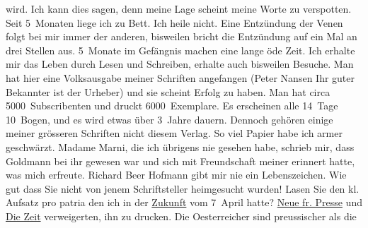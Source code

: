 \begin{ledgroupsized}[t]{13cm}
               wird.\pend
           \pstart
           Ich kann dies sagen, denn meine Lage scheint meine Worte zu verspotten. Seit
               5 Monaten liege ich zu Bett. Ich heile nicht. Eine Entzündung der Venen folgt bei mir
               immer der anderen, bisweilen bricht die Entzündung auf ein Mal an drei Stellen aus.
               5 Monate im Gefängnis machen eine lange öde Zeit. Ich erhalte mir das Leben {\pb}durch Lesen und Schreiben, erhalte
               auch bisweilen Besuche. Man hat hier eine Volksausgabe meiner Schriften angefangen (Peter Nansen Ihr guter Bekannter ist der
               Urheber) und sie scheint Erfolg zu haben. Man hat circa 5000 Subscribenten und druckt
               6000 Exemplare. Es erscheinen alle 14 Tage 10 Bogen, und es wird etwas über 3 Jahre
               dauern. Dennoch gehören einige meiner grösseren Schriften nicht diesem Verlag. So
               viel Papier habe ich armer geschwärzt.\pend
           \pstart
           Madame Marni, die ich übrigens nie gesehen
               habe, schrieb mir, dass Goldmann bei ihr
               gewesen war und sich mit Freundschaft meiner erinnert hatte, was mich erfreute. Richard Beer Hofmann gibt mir nie {\pb}ein Lebenszeichen.\pend
           \pstart
           Wie gut dass Sie nicht von jenem Schriftsteller heimgesucht wurden! Lasen Sie den kl.
                  Aufsatz pro patria den ich
               in der \uline{Zukunft} vom 7 April hatte? \uline{Neue fr. Presse} und \uline{Die Zeit} verweigerten, ihn zu drucken. Die Oesterreicher sind preussischer als die

\end{ledgroupsized}
